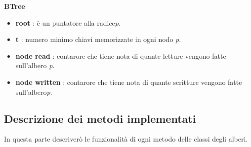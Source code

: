\item \textbf{BTree}
    \begin{itemize}
        \item \textbf{root} : è un puntatore alla radice\textit{p}.
        \item \textbf{t} : numero minimo chiavi memorizzate in ogni nodo \textit{p}.
        \item \textbf{node read} : contarore che tiene nota di quante letture vengono fatte sull'albero \textit{p}.
        \item \textbf{node written} : contarore che tiene nota di quante scritture vengono fatte sull'albero\textit{p}.
    \end{itemize}

\subsection{Descrizione dei metodi implementati}
\label{sec:DescrizioneMetodiImplementati_1}
In questa parte descriverò le funzionalità di ogni metodo delle classi degli alberi.

